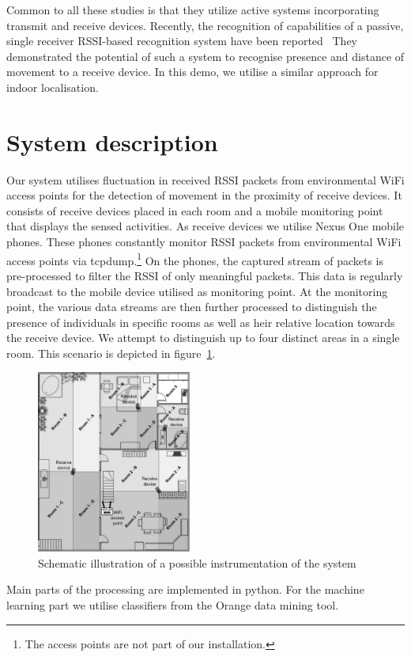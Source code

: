 \documentclass[journal]{IEEEtran}
\begin{document}
  Common to all these studies is that they utilize active systems incorporating transmit and receive devices.
  Recently, the recognition of capabilities of a passive, single receiver RSSI-based recognition system have been reported~\cite{Pervasive_Sigg_2014}
  They demonstrated the potential of such a system to recognise presence and distance of movement to a receive device.
  In this demo, we utilise a similar approach for indoor localisation.

  \section{System description}
  Our system utilises fluctuation in received RSSI packets from environmental WiFi access points for the detection of movement in the proximity of receive devices. 
  It consists of receive devices placed in each room and a mobile monitoring point that displays the sensed activities. 
  As receive devices we utilise Nexus One mobile phones.
  These phones constantly monitor RSSI packets from environmental WiFi access points via tcpdump.\footnote{The access points are not part of our installation.}
  On the phones, the captured stream of packets is pre-processed to filter the RSSI of only meaningful packets.
  This data is regularly broadcast to the mobile device utilised as monitoring point.
  At the monitoring point, the various data streams are then further processed to distinguish the presence of individuals in specific rooms as well as heir relative location towards the receive device. 
  We attempt to distinguish up to four distinct areas in a single room.
  This scenario is depicted in figure~\ref{figureScenario}.
  \begin{figure}
  \includegraphics[width=\columnwidth, height=6cm]{Figures/sketch.png}
  \caption{Schematic illustration of a possible instrumentation of the system}
  \label{figureScenario}
  \end{figure}
  Main parts of the processing are implemented in python. 
  For the machine learning part we utilise classifiers from the Orange data mining tool.
\end{document}
